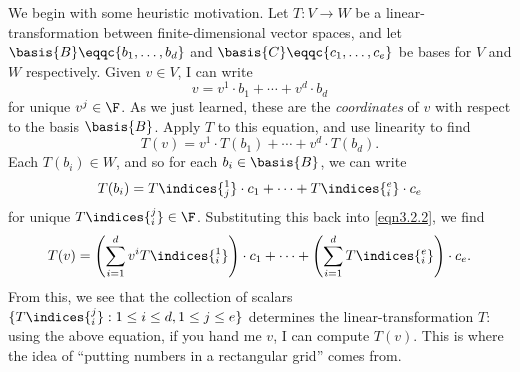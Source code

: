 We begin with some heuristic motivation.  Let $T\colon V\rightarrow W$ be a linear-transformation between finite-dimensional vector spaces, and let $\basis{B}\eqqc \{ b_1,\ldots ,b_d\}$ and $\basis{C}\eqqc \{ c_1,\ldots ,c_e\}$ be bases for $V$ and $W$ respectively.  Given $v\in V$, I can write
\begin{equation}
	v=v^1\cdot b_1+\cdots +v^d\cdot b_d
\end{equation}
for unique $v^j\in \F$.  As we just learned, these are the \emph{coordinates} of $v$ with respect to the basis $\basis{B}$.  Apply $T$ to this equation, and use linearity to find
\begin{equation}\label{eqn3.2.2}
	T(v)=v^1\cdot T(b_1)+\cdots +v^d\cdot T(b_d).
\end{equation}
Each $T(b_i)\in W$, and so for each $b_i\in \basis{B}$, we can write
\begin{equation}
	T(b_i)=T\indices{^1_j}\cdot c_1+\cdots +T\indices{^e_i}\cdot c_e
\end{equation}
for unique $T\indices{^j_i}\in \F$.  Substituting this back into \eqref{eqn3.2.2}, we find
\begin{equation}\label{eqn3.2.4}
T(v)=\left( \sum _{i=1}^dv^iT\indices{^1_i}\right) \cdot c_1+\cdots +\left( \sum _{i=1}^dT\indices{^e_i}\right) \cdot c_e.
\end{equation}
From this, we see that the collection of scalars $\{ T\indices{^j_i}:1\leq i\leq d,1\leq j\leq e\}$ determines the linear-transformation $T$:  using the above equation, if you hand me $v$, I can compute $T(v)$.  This is where the idea of ``putting numbers in a rectangular grid'' comes from.
